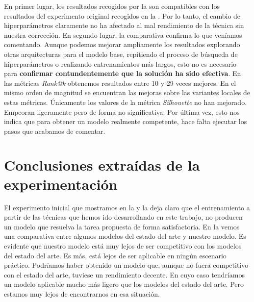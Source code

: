 En primer lugar, los resultados recogidos por la  son compatibles con los resultados del experimento original recogidos en la . Por lo tanto, el cambio de hiperparámetros claramente no ha afectado al mal rendimiento de la técnica sin nuestra corrección. En segundo lugar, la comparativa confirma lo que veníamos comentando. Aunque podemos mejorar ampliamente los resultados explorando otras arquitecturas para el modelo base, repitiendo el proceso de búsqueda de hiperparámetros o realizando entrenamientos más largos, esto no es necesario para \textbf{confirmar contundentemente que la solución ha sido efectiva}. En las métricas \textit{Rank@k} obtenemos resultados entre 10 y 29 veces mejores. En el mismo orden de magnitud se encuentran las mejoras sobre las variantes locales de estas métricas. Únicamente los valores de la métrica \textit{Silhouette} no han mejorado. Empeoran ligeramente pero de forma no significativa. Por última vez, esto nos indica que para obtener un modelo realmente competente, hace falta ejecutar los pasos que acabamos de comentar.

\section{Conclusiones extraídas de la experimentación} \label{isec:conclusiones_experimentacion}

El experimento inicial que mostramos en la  y la  deja claro que el entrenamiento a partir de las técnicas que hemos ido desarrollando en este trabajo, no producen un modelo que resuelva la tarea propuesta de forma satisfactoria. En la  vemos una comparativa entre algunos modelos del estado del arte y nuestro modelo. Es evidente que nuestro modelo está muy lejos de ser competitivo con los modelos del estado del arte. Es más, está lejos de ser aplicable en ningún escenario práctico. Podríamos haber obtenido un modelo que, aunque no fuera competitivo con el estado del arte, tuviese un rendimiento decente. En cuyo caso tendríamos un modelo aplicable mucho más ligero que los modelos del estado del arte. Pero estamos muy lejos de encontrarnos en esa situación.

